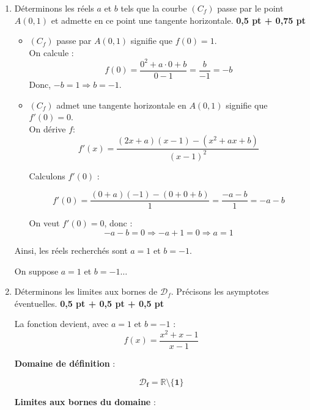 \documentclass[12pt,a4paper]{article}
\begin{document}
\begin{enumerate}
    \item Déterminons les réels \( a \) et \( b \) tels que la courbe \( (C_f) \) passe par le point \( A(0,1) \) et admette en ce point une tangente horizontale. \hfill \textbf{0{,}5 pt + 0{,}75 pt}

    \begin{itemize}
        \item \( (C_f) \) passe par \( A(0,1) \) signifie que \( f(0) = 1 \).\\

        On calcule :
        \[
        f(0) = \frac{0^2 + a \cdot 0 + b}{0 - 1} = \frac{b}{-1} = -b
        \]
        Donc, \( -b = 1 \Rightarrow \boxed{b = -1} \).

        \item \( (C_f) \) admet une tangente horizontale en \( A(0,1) \) signifie que \( f'(0) = 0 \).\\

        On dérive \( f \):
        \[
        f'(x) = \frac{(2x + a)(x - 1) - (x^2 + ax + b)}{(x - 1)^2}
        \]

        Calculons \( f'(0) \) :

        \[
        f'(0) = \frac{(0 + a)(-1) - (0 + 0 + b)}{1} = \frac{-a - b}{1} = -a - b
        \]

        On veut \( f'(0) = 0 \), donc :
        \[
        -a - b = 0 \Rightarrow -a + 1 = 0 \Rightarrow \boxed{a = 1}
        \]
    \end{itemize}

    Ainsi, les réels recherchés sont \( \boxed{a = 1} \) et \( \boxed{b = -1} \).

    
    On suppose \( a = 1 \) et \( b = -1 \dots \)
    
    \item Déterminons les limites aux bornes de \( \mathcal{D}_f \). Précisons les asymptotes éventuelles. \hfill \textbf{0{,}5 pt + 0{,}5 pt + 0{,}5 pt}

La fonction devient, avec \( a = 1 \) et \( b = -1 \) :
\[
f(x) = \frac{x^2 + x - 1}{x - 1}
\]

\textbf{Domaine de définition} :

    \begin{resultbox}
    \[
    \mathbf{\mathcal{D}_f = \mathbb{R} \setminus \{1\}}
    \]
		\end{resultbox}

\textbf{Limites aux bornes du domaine} :


\end{enumerate}
\end{document}
